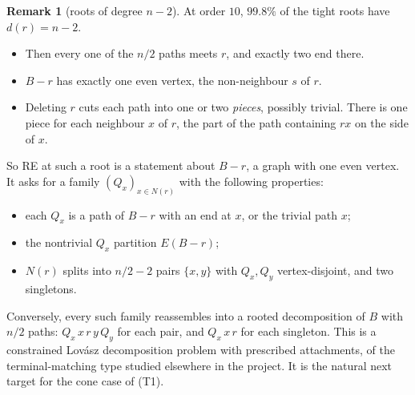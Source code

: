 \documentclass[11pt]{amsart}
\theoremstyle{definition}
\newtheorem{remark}[theorem]{Remark}
\begin{document}
\begin{remark}[roots of degree $n-2$]\label{rem:degn2}
At order $10$, $99.8\%$ of the tight roots have $d(r)=n-2$.
\begin{itemize}[leftmargin=*]
\item Then every one of the $n/2$ paths meets $r$, and exactly two end there.
\item $B-r$ has exactly one even vertex, the non-neighbour $s$ of $r$.
\item Deleting $r$ cuts each path into one or two \emph{pieces}, possibly trivial. There is one piece for
each neighbour $x$ of $r$, the part of the path containing $rx$ on the side of $x$.
\end{itemize}
So RE at such a root is a statement about $B-r$, a graph with one even vertex. It asks for a family
$(Q_x)_{x\in N(r)}$ with the following properties:
\begin{itemize}[leftmargin=*]
\item each $Q_x$ is a path of $B-r$ with an end at $x$, or the trivial path $x$;
\item the nontrivial $Q_x$ partition $E(B-r)$;
\item $N(r)$ splits into $n/2-2$ pairs $\{x,y\}$ with $Q_x,Q_y$ vertex-disjoint, and two singletons.
\end{itemize}
Conversely, every such family reassembles into a rooted decomposition of $B$ with $n/2$ paths:
$Q_x\,x\,r\,y\,Q_y$ for each pair, and $Q_x\,x\,r$ for each singleton.
This is a constrained Lov\'asz decomposition problem with prescribed attachments, of the
terminal-matching type studied elsewhere in the project. It is the natural next target for the cone
case of (T1).
\end{remark}
\end{document}
